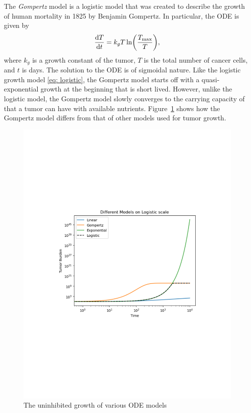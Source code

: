 \documentclass[11pt]{amsart}
\begin{document}

The \textit{Gompertz} model is a logistic model that was created to describe the growth of human mortality in 1825 by Benjamin Gompertz.
In particular, the ODE is given by
\begin{equation}
	\frac{\mathop{}\!\mathrm{d} T}{\mathop{}\!\mathrm{d} t} = k_g T \ln \biggl(\frac{T_{\max}}{T} \biggr) \label{eq: gompertz},
\end{equation}
where $k_g$ is a growth constant of the tumor, $T$ is the total number of cancer cells, and $t$ is days.
The solution to the ODE is of sigmoidal nature.
Like the logistic growth model \eqref{eq: logistic}, the Gompertz model starts off with a quasi-exponential growth at the beginning that is short lived.
However, unlike the logistic model, the Gompertz model slowly converges to the carrying capacity of that a tumor can have with available nutrients.
Figure~\ref{fig:odeModels} shows how the Gompertz model differs from that of other models used for tumor growth.

\begin{figure}
  \centering
    \vspace*{-42mm}
    	\begin{varwidth}{\linewidth}
		 \includegraphics[scale=0.5]{./images/ode_models.pdf}
		 \captionsetup{justification=centering, width=5cm}
		 \caption{The uninhibited growth of various ODE models}
		 \label{fig:odeModels}
	\end{varwidth}
	\vspace*{-40mm}
\end{figure}
\end{document}
